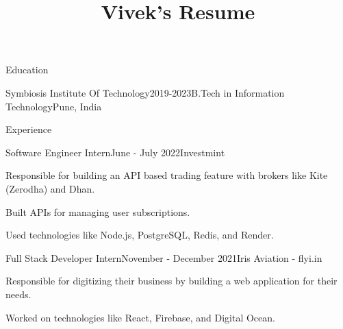 \documentclass{resume} %
\begin{document}
\title{Vivek's Resume}

\begin{rSection}{Education}

\begin{rSubsection}{Symbiosis Institute Of Technology}{2019-2023}{B.Tech in Information Technology}{Pune, India}

\vspace{-.65cm}
\item[]
\end{rSubsection}
\end{rSection}



\begin{rSection}{Experience}
\begin{rSubsection}{Software Engineer Intern}{June - July 2022}{Investmint}{}
\item Responsible for building an API based trading feature with brokers like Kite (Zerodha) and Dhan.
\item Built APIs for managing user subscriptions.
\item Used technologies like Node.js, PostgreSQL, Redis, and Render.
\end{rSubsection}
\begin{rSubsection}{Full Stack Developer Intern}{November - December 2021}{Iris Aviation - flyi.in}{}
\item Responsible for digitizing their business by building a web application for their needs.
\item Worked on technologies like React, Firebase, and Digital Ocean.
\end{rSubsection}
\end{rSection}
\end{document}
